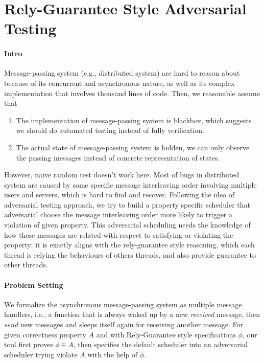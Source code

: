 \section{Rely-Guarantee Style Adversarial Testing}

\paragraph{Intro} Message-passing system (e.g., distributed system) are hard to reason about because of its concurrent and asynchronous nature, as well as its complex implementation that involves thousand lines of code. Then, we reasonable assume that
\begin{enumerate}
    \item The implementation of message-passing system is blackbox, which suggests we should do automated testing instead of fully verification.
    \item The actual state of message-passing system is hidden, we can only observe the passing messages instead of concrete representation of states.
\end{enumerate}
However, naive random test doesn't work here. Most of bugs in distributed system are caused by some specific message interleaving order involving multiple users and servers, which is hard to find and recover. Following the idea of adversarial testing approach, we try to build a property specific scheduler that adversarial choose the message interleaving order more likely to trigger a violation of given property. This adversarial scheduling needs the knowledge of how these messages are related with respect to satisfying or violating the property; it is exactly aligns with the rely-guarantee style reasoning, which each thread is relying the behaviours of others threads, and also provide guarantee to other threads.

\paragraph{Problem Setting} We formalize the asynchronous message-passing system as multiple message handlers, i.e., a function that is always waked up by a new \emph{received} message, then \emph{send} new messages and sleeps itself again for receiving another message. For given correctness property $A$ and with Rely-Guarantee style specifications $\phi$, our tool first proves $\phi \models A$, then specifies the default scheduler into an adversarial scheduler trying violate $A$ with the help of $\phi$.


